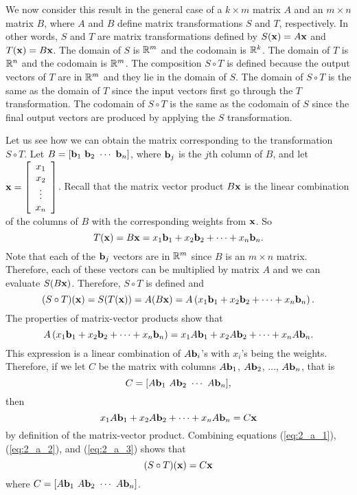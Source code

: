 We now consider this result in the general case of a $k\times m$ matrix $A$ and an $m \times n$ matrix $B$, where $A$ and $B$ define matrix transformations $S$ and $T$, respectively. In other words, $S$ and $T$ are matrix transformations defined by $S(\mathbf{x}) = A\mathbf{x}$ and $T(\mathbf{x}) = B\mathbf{x}$. The domain of $S$ is $\mathbb{R}^m$ and the codomain is $\mathbb{R}^k$. The domain of $T$ is $\mathbb{R}^n$ and the codomain is $\mathbb{R}^m$. The composition $S\circ T$ is defined because the output vectors of $T$ are in $\mathbb{R}^m$ and they lie in the domain of $S$. The domain of $S\circ T$ is the same as the domain of $T$ since the input vectors first go through the $T$ transformation. The codomain of $S\circ T$ is the same as the codomain of $S$ since the final output vectors are produced by applying the $S$ transformation.

Let us see how we can obtain the matrix corresponding to the transformation $S\circ T$. Let $B = \left[ \vb_1 \ \vb_2  \  \cdots \ \vb_n  \right]$, where $\mathbf{b}_j$ is the $j$th column of $B$, and let $\mathbf{x} = \left[ \begin{array}{c} x_1 \\ x_2 \\ \vdots \\ x_n \end{array} \right]$. Recall that the matrix vector product $B\mathbf{x}$ is the linear combination of the columns of $B$ with the corresponding weights from $\mathbf{x}$. So
\[T(\mathbf{x}) = B\mathbf{x} = x_1 \mathbf{b}_1 + x_2 \mathbf{b}_2 + \cdots + x_n \mathbf{b}_n.\]
Note that each of the $\mathbf{b}_j$ vectors are in $\mathbb{R}^m$ since $B$ is an $m\times n$ matrix. Therefore, each of these vectors can be multiplied by matrix $A$ and we can evaluate $S(B\mathbf{x})$. Therefore, $S\circ T$ is defined and 
\begin{equation} 
(S \circ T)(\mathbf{x}) = S(T(\mathbf{x}))= A(B\mathbf{x}) = A\left( x_1 \mathbf{b}_1 + x_2 \mathbf{b}_2 + \cdots + x_n \mathbf{b}_n\right). \label{eq:2_a_1}
\end{equation}
The properties of matrix-vector products show that
\begin{equation} 
A\left( x_1 \mathbf{b}_1 + x_2 \mathbf{b}_2 + \cdots + x_n \mathbf{b}_n\right) = x_1 A\mathbf{b}_1 + x_2 A\mathbf{b}_2 + \cdots + x_n A\mathbf{b}_n. \label{eq:2_a_2}
\end{equation}
This expression is a linear combination of $A\mathbf{b}_i$'s with $x_i$'s being the weights. Therefore, if we let $C$ be the matrix with columns $A \mathbf{b}_1$, $A\mathbf{b}_2$, $\ldots$, $A\mathbf{b}_n$, that is
\[C = [A \vb_1 \ A\vb_2 \ \cdots \ A\vb_n],\]
then 
\begin{equation}
x_1 A\mathbf{b}_1 + x_2 A\mathbf{b}_2 + \cdots + x_n A\mathbf{b}_n = C \mathbf{x} \label{eq:2_a_3}
\end{equation}
by definition of the matrix-vector product. Combining equations (\ref{eq:2_a_1}), (\ref{eq:2_a_2}), and (\ref{eq:2_a_3}) shows that
\[(S \circ T)(\mathbf{x}) = C \mathbf{x}\]
where $C = [A \vb_1 \ A\vb_2 \ \cdots \ A\vb_n]$. 

